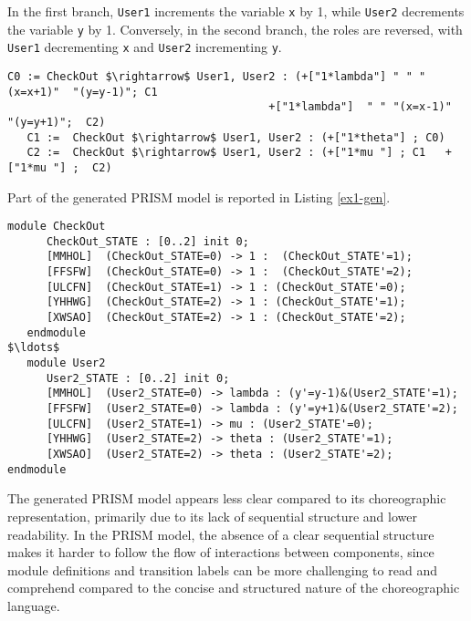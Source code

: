  In the first branch, \texttt{User1} increments the variable \texttt{x} by 1, while \texttt{User2} decrements the variable \texttt{y} by 1. Conversely, in the second branch, the roles are reversed, with \texttt{User1} decrementing \texttt{x} and \texttt{User2} incrementing \texttt{y}.

 \begin{lstlisting}[style=chor-color,breaklines=true, postbreak=\mbox{\textcolor{red}{$\hookrightarrow$}\space},caption={Choreography for the Modified thinkteam Protocol},captionpos=b,label={ex1-chor}]
   C0 := CheckOut $\rightarrow$ User1, User2 : (+["1*lambda"] " " "(x=x+1)"  "(y=y-1)"; C1
                                       	+["1*lambda"]  " " "(x=x-1)"  "(y=y+1)";  C2)
   C1 :=  CheckOut $\rightarrow$ User1, User2 : (+["1*theta"] ; C0)  
   C2 :=  CheckOut $\rightarrow$ User1, User2 : (+["1*mu "] ; C1   +["1*mu "] ;  C2)
 \end{lstlisting}

 Part of the generated PRISM model is reported in Listing \ref{ex1-gen}. 

 \begin{lstlisting}[style=prism-color,caption={Generated PRISM program},captionpos=b,label={ex1-gen}]
   module CheckOut
      CheckOut_STATE : [0..2] init 0;
      [MMHOL]  (CheckOut_STATE=0) -> 1 :  (CheckOut_STATE'=1);
      [FFSFW]  (CheckOut_STATE=0) -> 1 :  (CheckOut_STATE'=2);
      [ULCFN]  (CheckOut_STATE=1) -> 1 : (CheckOut_STATE'=0);
      [YHHWG]  (CheckOut_STATE=2) -> 1 : (CheckOut_STATE'=1);
      [XWSAO]  (CheckOut_STATE=2) -> 1 : (CheckOut_STATE'=2);
   endmodule
$\ldots$
   module User2
      User2_STATE : [0..2] init 0;
      [MMHOL]  (User2_STATE=0) -> lambda : (y'=y-1)&(User2_STATE'=1);
      [FFSFW]  (User2_STATE=0) -> lambda : (y'=y+1)&(User2_STATE'=2);
      [ULCFN]  (User2_STATE=1) -> mu : (User2_STATE'=0);
      [YHHWG]  (User2_STATE=2) -> theta : (User2_STATE'=1);
      [XWSAO]  (User2_STATE=2) -> theta : (User2_STATE'=2);
endmodule
\end{lstlisting}
The generated PRISM model appears less clear compared to its
choreographic representation, primarily due to its lack of sequential
structure and lower readability.  In the PRISM model, the absence of a
clear sequential structure makes it harder to follow the flow of
interactions between components, %
since module definitions and transition labels can be more challenging
to read and comprehend compared to the concise and structured nature
of the choreographic language. %


